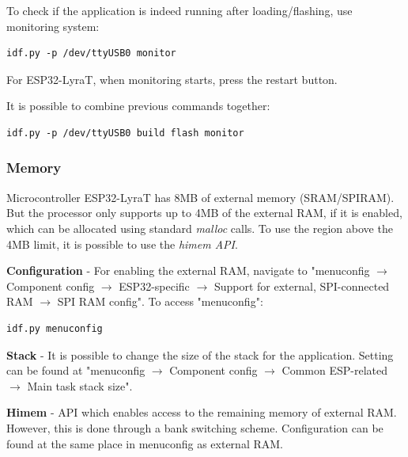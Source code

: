 \documentclass[thesis=M,english]{FITthesis}[2019/12/23]
\begin{document}
\bigskip
\noindent
To check if the application is indeed running after loading/flashing, use monitoring system:
\begin{lstlisting}[frame=single]
idf.py -p /dev/ttyUSB0 monitor
\end{lstlisting}
For ESP32-LyraT, when monitoring starts, press the restart button.

\bigskip
\noindent
It is possible to combine previous commands together:
\begin{lstlisting}[frame=single]
idf.py -p /dev/ttyUSB0 build flash monitor
\end{lstlisting}

\subsubsection{Memory} \label{esp-memory}
Microcontroller ESP32-LyraT has 8MB of external memory (SRAM/SPIRAM). But the processor only supports up to 4MB of the external RAM, if it is enabled, which can be allocated using standard \textit{malloc} calls. To use the region above the 4MB limit, it is possible to use the \textit{himem API}.

\bigskip
\noindent
\textbf{Configuration} - For enabling the external RAM, navigate to "menuconfig $\rightarrow$ Component config $\rightarrow$ ESP32-specific $\rightarrow$ Support for external, SPI-connected RAM $\rightarrow$ SPI RAM config". To access "menuconfig":
\begin{lstlisting}[frame=single]
idf.py menuconfig
\end{lstlisting}

\bigskip
\noindent
\textbf{Stack} - It is possible to change the size of the stack for the application. Setting can be found at "menuconfig $\rightarrow$ Component config $\rightarrow$ Common ESP-related $\rightarrow$ Main task stack size".

\bigskip
\noindent
\textbf{Himem} - API which enables access to the remaining memory of external RAM. However, this is done through a bank switching scheme. Configuration can be found at the same place in menuconfig as external RAM.

\end{document}
